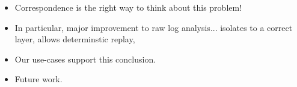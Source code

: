 \begin{itemize}
\item Correspondence is the right way to think about this problem! 
\item In particular, major improvement to raw log analysis... isolates to a
correct layer, allows determinstic replay, 
\item Our use-cases support this conclusion.
\item Future work. 
\end{itemize}

